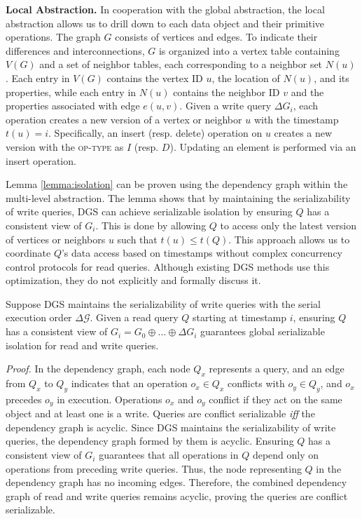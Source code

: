 \vspace{2pt}
\noindent\textbf{Local Abstraction.} In cooperation with the global abstraction, the local abstraction allows us to drill down to each data object and their primitive operations. The graph $G$ consists of vertices and edges. To indicate their differences and interconnections, $G$ is organized into a vertex table containing $V(G)$ and a set of neighbor tables, each corresponding to a neighbor set $N(u)$. Each entry in $V(G)$ contains the vertex ID $u$, the location of $N(u)$, and its properties, while each entry in $N(u)$ contains the neighbor ID $v$ and the properties associated with edge $e(u, v)$. Given a write query $\Delta G_i$, each operation creates a new version of a vertex or neighbor $u$ with the timestamp $t(u) = i$. Specifically, an insert (resp. delete) operation on $u$ creates a new version with the \textsc{op-type} as $I$ (resp. $D$). Updating an element is performed via an insert operation.

Lemma \ref{lemma:isolation} can be proven using the dependency graph \cite{fekete2005making} within the multi-level abstraction.  The lemma shows that by maintaining the serializability of write queries, DGS can achieve serializable isolation by ensuring $Q$ has a consistent view of $G_i$. This is done by allowing $Q$ to access only the latest version of vertices or neighbors $u$ such that $t(u) \leqslant t(Q)$. This approach allows us to coordinate $Q$'s data access based on timestamps without complex concurrency control protocols for read queries. Although existing DGS methods use this optimization, they do not explicitly and formally discuss it.

\begin{lemma} \label{lemma:isolation}
Suppose DGS maintains the serializability of write queries with the serial execution order $\Delta \mathcal{G}$. Given a read query $Q$ starting at timestamp $i$, ensuring $Q$ has a consistent view of $G_i = G_0 \oplus...\oplus \Delta G_i$ guarantees global serializable isolation for read and write queries.
\end{lemma}
\emph{Proof.} In the dependency graph, each node $Q_x$ represents a query, and an edge from $Q_x$ to $Q_y$ indicates that an operation $o_x \in Q_x$ conflicts with $o_y \in Q_y$, and $o_x$ precedes $o_y$ in execution. Operations $o_x$ and $o_y$ conflict if they act on the same object and at least one is a write. Queries are conflict serializable \emph{iff} the dependency graph is acyclic. Since DGS maintains the serializability of write queries, the dependency graph formed by them is acyclic. Ensuring $Q$ has a consistent view of $G_i$ guarantees that all operations in $Q$ depend only on operations from preceding write queries. Thus, the node representing $Q$ in the dependency graph has no incoming edges. Therefore, the combined dependency graph of read and write queries remains acyclic, proving the queries are conflict serializable.





